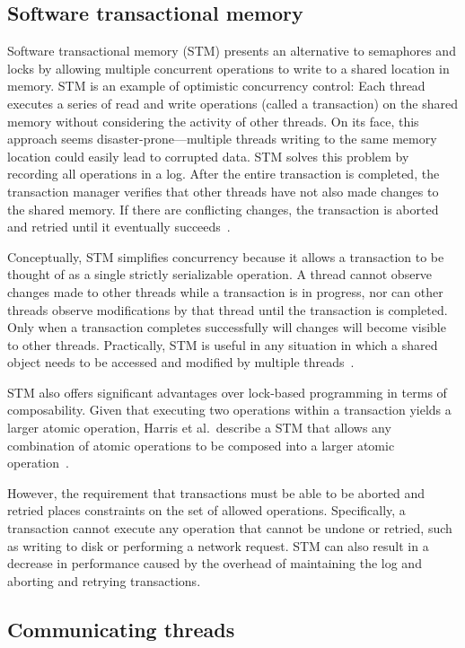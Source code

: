 \documentclass{sig-alternate}
\begin{document}
\subsection{Software transactional memory}

Software transactional memory (STM) presents an alternative to semaphores and locks by allowing multiple concurrent operations to write to a shared location in memory. STM is an example of optimistic concurrency control: Each thread executes a series of read and write operations (called a transaction) on the shared memory without considering the activity of other threads. On its face, this approach seems disaster-prone---multiple threads writing to the same memory location could easily lead to corrupted data. STM solves this problem by recording all operations in a log. After the entire transaction is completed, the transaction manager verifies that other threads have not also made changes to the shared memory. If there are conflicting changes, the transaction is aborted and retried until it eventually succeeds~\cite{Shavit1995}.

Conceptually, STM simplifies concurrency because it allows a transaction to be thought of as a single strictly serializable operation. A thread cannot observe changes made to other threads while a transaction is in progress, nor can other threads observe modifications by that thread until the transaction is completed. Only when a transaction completes successfully will changes will become visible to other threads. Practically, STM is useful in any situation in which a shared object needs to be accessed and modified by multiple threads~\cite{Swalens2014}.

STM also offers significant advantages over lock-based programming in terms of composability. Given that executing two operations within a transaction yields a larger atomic operation, Harris et al.\ describe a STM that allows any combination of atomic operations to be composed into a larger atomic operation~\cite{Harris2005}.

However, the requirement that transactions must be able to be aborted and retried places constraints on the set of allowed operations. Specifically, a transaction cannot execute any operation that cannot be undone or retried, such as writing to disk or performing a network request. STM can also result in a decrease in performance caused by the overhead of maintaining the log and aborting and retrying transactions.

\subsection{Communicating threads}
\end{document}
